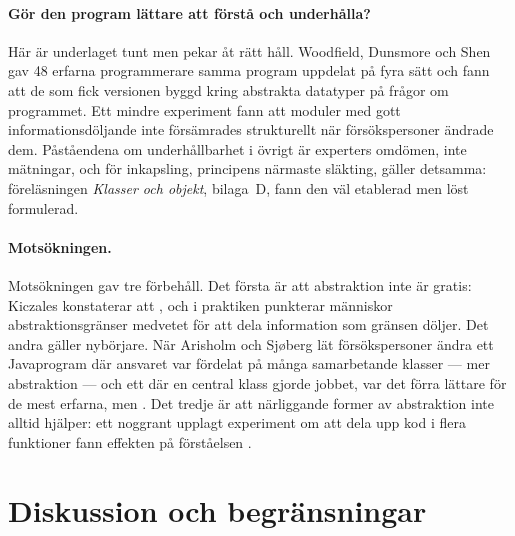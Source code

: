 \paragraph{Gör den program lättare att förstå och underhålla?}  Här är
underlaget tunt men pekar åt rätt håll.  Woodfield, Dunsmore och Shen
gav 48 erfarna programmerare samma program uppdelat på fyra sätt och fann
att de som fick versionen byggd kring abstrakta datatyper
 på frågor om programmet.
Ett mindre experiment fann att moduler med gott informationsdöljande
inte försämrades strukturellt när försökspersoner ändrade
dem\autocite{RisingCalliss1993}.  Påståendena om underhållbarhet i
övrigt är experters omdömen\autocite{Liskov1987}, inte mätningar, och
för inkapsling, principens närmaste släkting, gäller detsamma:
föreläsningen \emph{Klasser och objekt}, bilaga~D, fann den väl
etablerad men löst formulerad.

\paragraph{Motsökningen.}  Motsökningen gav tre förbehåll.  Det första
är att abstraktion inte är gratis: Kiczales konstaterar att
,
och i praktiken punkterar människor abstraktionsgränser medvetet för att
dela information som gränsen döljer\autocite{Subramonyam2022Leaky}.  Det
andra gäller nybörjare.  När Arisholm och Sjøberg lät försökspersoner
ändra ett Javaprogram där ansvaret var fördelat på många samarbetande
klasser --- mer abstraktion --- och ett där en central klass gjorde
jobbet, var det förra lättare för de mest erfarna, men
.  Det tredje är att
närliggande former av abstraktion inte alltid hjälper: ett noggrant
upplagt experiment om att dela upp kod i flera funktioner fann effekten
på förståelsen .

\section{Diskussion och begränsningar}
\label{sec:abs-diskussion}

